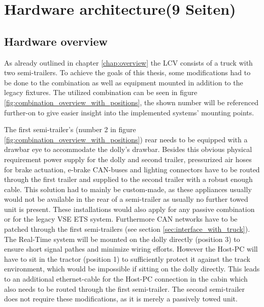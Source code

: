 \documentclass[ExampleMasters.tex]{subfiles}
\begin{document}
\clearpage


\chapter{Hardware architecture(9 Seiten)}
\label{chap:hardware_setup}

\section{Hardware overview}

As already outlined in chapter \ref{chap:overview} the LCV consists of a truck with two semi-trailers. To achieve the goals of this thesis, some modifications had to be done to the combination as well as equipment mounted in addition to the legacy fixtures. The utilized combination can be seen in figure \ref{fig:combination_overview_with_positions}, the shown number will be referenced further-on to give easier insight into the implemented systems' mounting points.


The first semi-trailer's (number 2 in figure \ref{fig:combination_overview_with_positions}) rear needs to be equipped with a drawbar eye to accommodate the dolly's drawbar. Besides this obvious physical requirement power supply for the dolly and second trailer, pressurized air hoses for brake actuation, e-brake CAN-buses and lighting connectors have to be routed through the first trailer and supplied to the second trailer with a robust enough cable. This solution had to mainly be custom-made, as these appliances usually would not be available in the rear of a semi-trailer as usually no further towed unit is present. These installations would also apply for any passive combination or for the legacy VSE ETS system. Furthermore CAN networks have to be patched through the first semi-trailers (see section \ref{sec:interface_with_truck}). The Real-Time system will be mounted on the dolly directly (position 3) to ensure short signal pathes and minimize wiring efforts. However the Host-PC will have to sit in the tractor (position 1) to sufficiently protect it against the track environment, which would be impossible if sitting on the dolly directly. This leads to an additional ethernet-cable for the Host-PC connection in the cabin which also needs to be routed through the first semi-trailer. The second semi-trailer does not require these modifications, as it is merely a passively towed unit.
\end{document}
